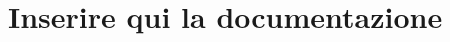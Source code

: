 \chapter{Inserire qui la documentazione}
\hypertarget{md_docs_2_r_e_a_d_m_e}{}\label{md_docs_2_r_e_a_d_m_e}
\label{md_docs_2_r_e_a_d_m_e_autotoc_md0}%
%
